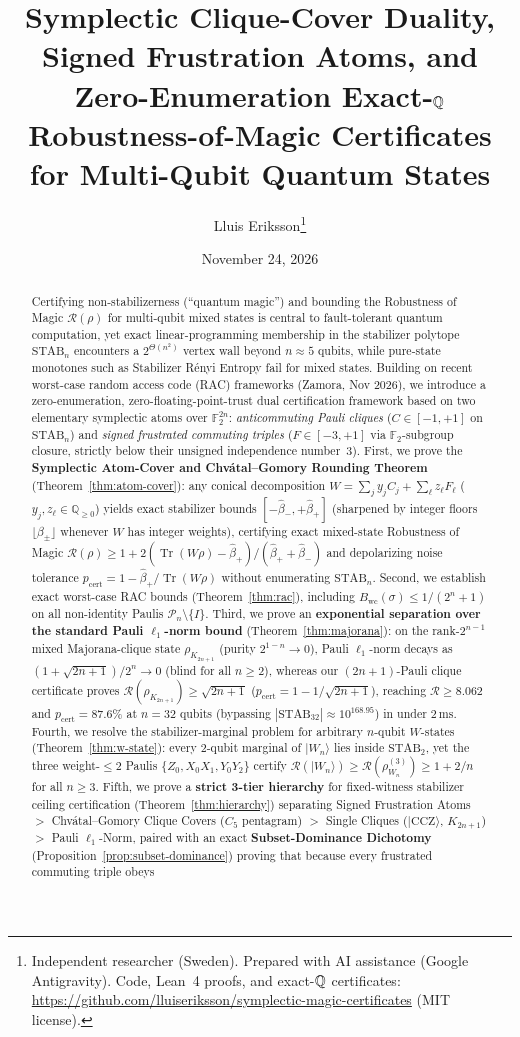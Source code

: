\documentclass[11pt,a4paper]{article}
\title{\textbf{Symplectic Clique-Cover Duality, Signed Frustration Atoms, and Zero-Enumeration Exact-$\Q$ Robustness-of-Magic Certificates for Multi-Qubit Quantum States}}
\author{
  Lluis Eriksson\thanks{Independent researcher (Sweden). Prepared with AI assistance (Google Antigravity). Code, Lean~4 proofs, and exact-$\Q$ certificates: \url{https://github.com/lluiseriksson/symplectic-magic-certificates} (MIT license).}
}
\date{November 24, 2026}
\theoremstyle{definition}
\theoremstyle{remark}
\newcommand{\F}{\mathbb{F}}
\newcommand{\Q}{\mathbb{Q}}
\newcommand{\STAB}{\mathrm{STAB}}
\newcommand{\RoM}{\mathcal{R}}
\newcommand{\Pauli}{\mathcal{P}}
\newcommand{\Tr}{\operatorname{Tr}}
\begin{document}
\maketitle

\begin{abstract}
Certifying non-stabilizerness (``quantum magic'') and bounding the Robustness of Magic $\RoM(\rho)$ for multi-qubit mixed states is central to fault-tolerant quantum computation, yet exact linear-programming membership in the stabilizer polytope $\STAB_n$ encounters a $2^{\Theta(n^2)}$ vertex wall beyond $n \approx 5$ qubits, while pure-state monotones such as Stabilizer R\'enyi Entropy fail for mixed states. Building on recent worst-case random access code (RAC) frameworks (Zamora, Nov 2026), we introduce a zero-enumeration, zero-floating-point-trust dual certification framework based on two elementary symplectic atoms over $\F_2^{2n}$: \emph{anticommuting Pauli cliques} ($C \in [-1, +1]$ on $\STAB_n$) and \emph{signed frustrated commuting triples} ($F \in [-3, +1]$ via $\F_2$-subgroup closure, strictly below their unsigned independence number~$3$). First, we prove the \textbf{Symplectic Atom-Cover and Chv\'atal--Gomory Rounding Theorem} (Theorem~\ref{thm:atom-cover}): any conical decomposition $W = \sum_j y_j C_j + \sum_\ell z_\ell F_\ell$ ($y_j, z_\ell \in \Q_{\ge 0}$) yields exact stabilizer bounds $[-\hat{\beta}_-, +\hat{\beta}_+]$ (sharpened by integer floors $\lfloor \beta_\pm \rfloor$ whenever $W$ has integer weights), certifying exact mixed-state Robustness of Magic $\RoM(\rho) \ge 1 + 2(\Tr(W\rho) - \hat{\beta}_+)/(\hat{\beta}_+ + \hat{\beta}_-)$ and depolarizing noise tolerance $p_{\mathrm{cert}} = 1 - \hat{\beta}_+/\Tr(W\rho)$ without enumerating $\STAB_n$. Second, we establish exact worst-case RAC bounds (Theorem~\ref{thm:rac}), including $B_{\mathrm{wc}}(\sigma) \le 1/(2^n + 1)$ on all non-identity Paulis $\Pauli_n \setminus \{I\}$. Third, we prove an \textbf{exponential separation over the standard Pauli $\ell_1$-norm bound} (Theorem~\ref{thm:majorana}): on the rank-$2^{n-1}$ mixed Majorana-clique state $\rho_{K_{2n+1}}$ (purity $2^{1-n} \to 0$), Pauli $\ell_1$-norm decays as $(1+\sqrt{2n+1})/2^n \to 0$ (blind for all $n \ge 2$), whereas our $(2n+1)$-Pauli clique certificate proves $\RoM(\rho_{K_{2n+1}}) \ge \sqrt{2n+1}$ ($p_{\mathrm{cert}} = 1 - 1/\sqrt{2n+1}$), reaching $\RoM \ge 8.062$ and $p_{\mathrm{cert}} = 87.6\%$ at $n = 32$ qubits (bypassing $|\STAB_{32}| \approx 10^{168.95}$) in under $2\,\mathrm{ms}$. Fourth, we resolve the stabilizer-marginal problem for arbitrary $n$-qubit $W$-states (Theorem~\ref{thm:w-state}): every 2-qubit marginal of $|W_n\rangle$ lies inside $\STAB_2$, yet the three weight-$\le 2$ Paulis $\{Z_0, X_0 X_1, Y_0 Y_2\}$ certify $\RoM(|W_n\rangle) \ge \RoM(\rho^{(3)}_{W_n}) \ge 1 + 2/n$ for all $n \ge 3$. Fifth, we prove a \textbf{strict 3-tier hierarchy} for fixed-witness stabilizer ceiling certification (Theorem~\ref{thm:hierarchy}) separating Signed Frustration Atoms $>$ Chv\'atal--Gomory Clique Covers ($C_5$ pentagram) $>$ Single Cliques ($|\mathrm{CCZ}\rangle$, $K_{2n+1}$) $>$ Pauli $\ell_1$-Norm, paired with an exact \textbf{Subset-Dominance Dichotomy} (Proposition~\ref{prop:subset-dominance}) proving that because every frustrated commuting triple obeys 
\end{abstract}
\end{document}

